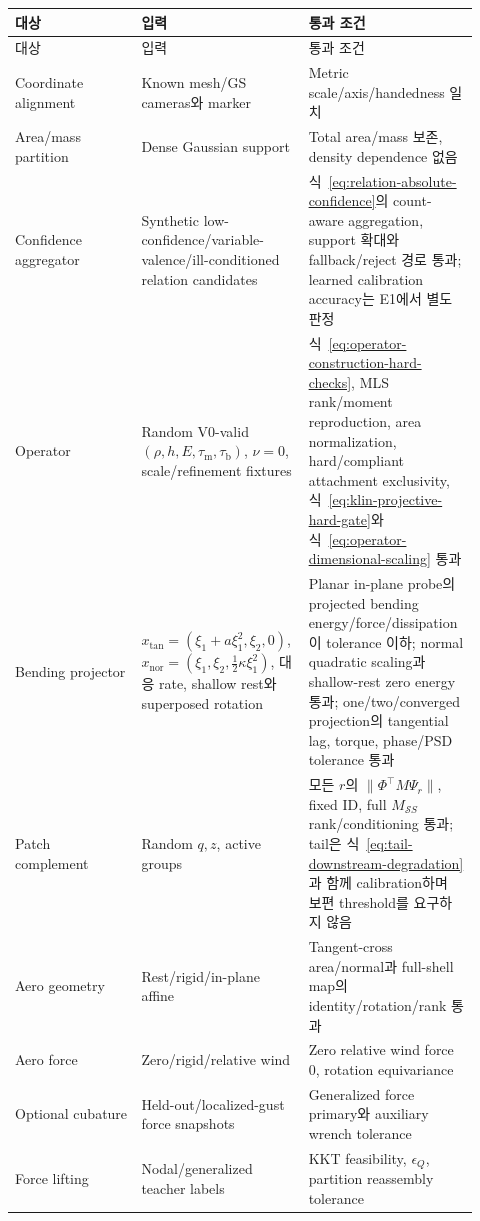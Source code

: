 \documentclass[11pt,a4paper]{article}
\begin{document}
\begin{longtable}{L{0.26\linewidth}L{0.34\linewidth}L{0.32\linewidth}}
\toprule
대상 & 입력 & 통과 조건 \\
\midrule
\endfirsthead
\toprule
대상 & 입력 & 통과 조건 \\
\midrule
\endhead
Coordinate alignment & Known mesh/GS cameras와 marker & Metric scale/axis/handedness 일치 \\
\addlinespace
Area/mass partition & Dense Gaussian support & Total area/mass 보존, density dependence 없음 \\
\addlinespace
Confidence aggregator & Synthetic low-confidence/variable-valence/ill-conditioned relation candidates & 식~\eqref{eq:relation-absolute-confidence}의 count-aware aggregation, support 확대와 fallback/reject 경로 통과; learned calibration accuracy는 E1에서 별도 판정 \\
\addlinespace
Operator & Random V0-valid \((\rho,h,E,\tau_{\mathrm m},\tau_{\mathrm b})\), \(\nu=0\), scale/refinement fixtures & 식~\eqref{eq:operator-construction-hard-checks}, MLS rank/moment reproduction, area normalization, hard/compliant attachment exclusivity, 식~\eqref{eq:klin-projective-hard-gate}와 식~\eqref{eq:operator-dimensional-scaling} 통과 \\
\addlinespace
Bending projector & \(x_{\mathrm{tan}}=(\xi_1+a\xi_1^2,\xi_2,0)\), \(x_{\mathrm{nor}}=(\xi_1,\xi_2,\tfrac12\kappa\xi_1^2)\), 대응 rate, shallow rest와 superposed rotation & Planar in-plane probe의 projected bending energy/force/dissipation이 tolerance 이하; normal quadratic scaling과 shallow-rest zero energy 통과; one/two/converged projection의 tangential lag, torque, phase/PSD tolerance 통과 \\
\addlinespace
Patch complement & Random \(q,z\), active groups & 모든 \(r\)의 \(\|\Phi^\top M\Psi_r\|\), fixed ID, full \(M_{\mathcal SS}\) rank/conditioning 통과; tail은 식~\eqref{eq:tail-downstream-degradation}과 함께 calibration하며 보편 threshold를 요구하지 않음 \\
\addlinespace
Aero geometry & Rest/rigid/in-plane affine & Tangent-cross area/normal과 full-shell map의 identity/rotation/rank 통과 \\
\addlinespace
Aero force & Zero/rigid/relative wind & Zero relative wind force 0, rotation equivariance \\
\addlinespace
Optional cubature & Held-out/localized-gust force snapshots & Generalized force primary와 auxiliary wrench tolerance \\
\addlinespace
Force lifting & Nodal/generalized teacher labels & KKT feasibility, \(\epsilon_Q\), partition reassembly tolerance \\

\end{longtable}
\end{document}
